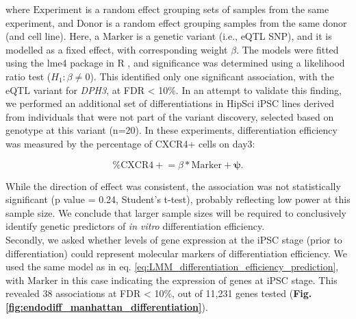 where $\mathrm{Experiment}$ is a random effect grouping sets of samples from the same experiment, and $\mathrm{Donor}$ is a random effect grouping samples from the same donor (and cell line). 
Here, a $\mathrm{Marker}$ is a genetic variant (i.e., eQTL SNP), and it is modelled as a fixed effect, with corresponding weight $\beta$.
The models were fitted using the lme4 package in R \cite{bates2014fitting}, and significance was determined using a likelihood ratio test ($H_1: \beta \neq 0$).
This identified only one significant association, with the eQTL variant for \textit{DPH3}, at FDR < 10\%.
In an attempt to validate this finding, we performed an additional set of differentiations in HipSci iPSC lines derived from individuals that were not part of the variant discovery, selected based on genotype at this variant (n=20). 
In these experiments, differentiation efficiency was measured by the percentage of CXCR4+ cells on day3:

\begin{equation}
    \mathrm{\% CXCR4+} = \beta*\mathrm{Marker} + \boldsymbol{\psi}.
\end{equation}

While the direction of effect was consistent, the association was not statistically significant (p value = 0.24, Student’s t-test), probably reflecting low power at this sample size. 
We conclude that larger sample sizes will be required to conclusively identify genetic predictors of \textit{in vitro} differentiation efficiency.\\

Secondly, we asked whether levels of gene expression at the iPSC stage (prior to differentiation) could represent molecular markers of differentiation efficiency.
We used the same model as in eq. \eqref{eq:LMM_differentiation_efficiency_prediction}, with $\mathrm{Marker}$ in this case indicating the expression of genes at iPSC stage.
This revealed 38 associations at FDR < 10\%, out of 11,231 genes tested (\textbf{Fig. \ref{fig:endodiff_manhattan_differentiation}}).


